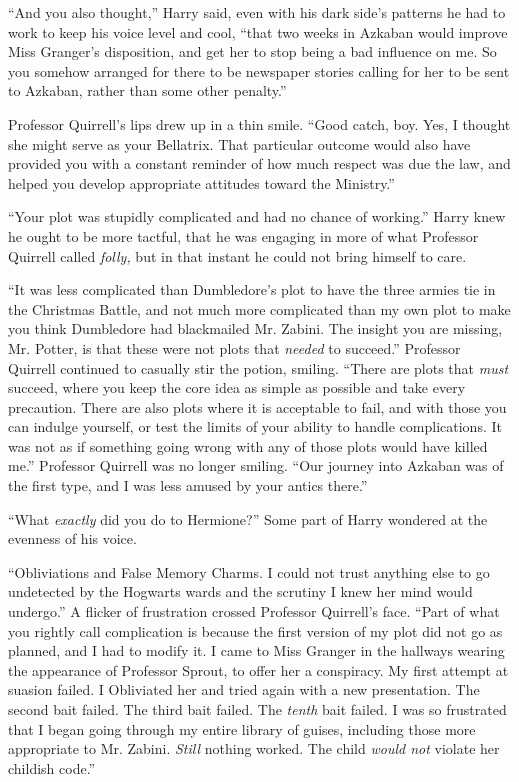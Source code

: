 ``And you also thought,'' Harry said, even with his dark side's patterns he had to work to keep his voice level and cool, ``that two weeks in Azkaban would improve Miss Granger's disposition, and get her to stop being a bad influence on me. So you somehow arranged for there to be newspaper stories calling for her to be sent to Azkaban, rather than some other penalty.''

Professor Quirrell's lips drew up in a thin smile. ``Good catch, boy. Yes, I thought she might serve as your Bellatrix. That particular outcome would also have provided you with a constant reminder of how much respect was due the law, and helped you develop appropriate attitudes toward the Ministry.''

``Your plot was stupidly complicated and had no chance of working.'' Harry knew he ought to be more tactful, that he was engaging in more of what Professor Quirrell called \emph{folly,} but in that instant he could not bring himself to care.

``It was less complicated than Dumbledore's plot to have the three armies tie in the Christmas Battle, and not much more complicated than my own plot to make you think Dumbledore had blackmailed Mr. Zabini. The insight you are missing, Mr. Potter, is that these were not plots that \emph{needed} to succeed.'' Professor Quirrell continued to casually stir the potion, smiling. ``There are plots that \emph{must} succeed, where you keep the core idea as simple as possible and take every precaution. There are also plots where it is acceptable to fail, and with those you can indulge yourself, or test the limits of your ability to handle complications. It was not as if something going wrong with any of those plots would have killed me.'' Professor Quirrell was no longer smiling. ``Our journey into Azkaban was of the first type, and I was less amused by your antics there.''

``What \emph{exactly} did you do to Hermione?'' Some part of Harry wondered at the evenness of his voice.

``Obliviations and False Memory Charms. I could not trust anything else to go undetected by the Hogwarts wards and the scrutiny I knew her mind would undergo.'' A flicker of frustration crossed Professor Quirrell's face. ``Part of what you rightly call complication is because the first version of my plot did not go as planned, and I had to modify it. I came to Miss Granger in the hallways wearing the appearance of Professor Sprout, to offer her a conspiracy. My first attempt at suasion failed. I Obliviated her and tried again with a new presentation. The second bait failed. The third bait failed. The \emph{tenth} bait failed. I was so frustrated that I began going through my entire library of guises, including those more appropriate to Mr. Zabini. \emph{Still} nothing worked. The child \emph{would not} violate her childish code.''

